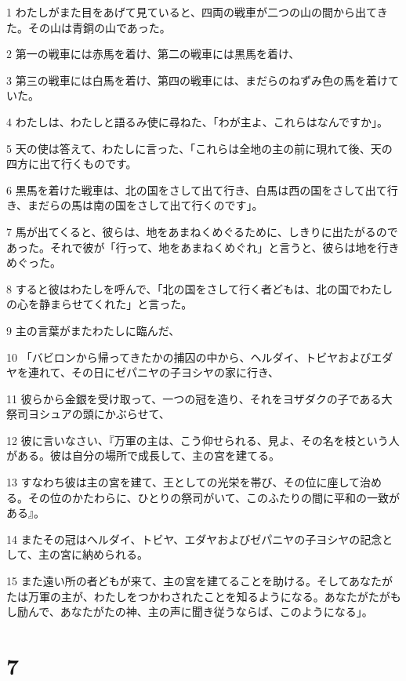 \par 1 わたしがまた目をあげて見ていると、四両の戦車が二つの山の間から出てきた。その山は青銅の山であった。
\par 2 第一の戦車には赤馬を着け、第二の戦車には黒馬を着け、
\par 3 第三の戦車には白馬を着け、第四の戦車には、まだらのねずみ色の馬を着けていた。
\par 4 わたしは、わたしと語るみ使に尋ねた、「わが主よ、これらはなんですか」。
\par 5 天の使は答えて、わたしに言った、「これらは全地の主の前に現れて後、天の四方に出て行くものです。
\par 6 黒馬を着けた戦車は、北の国をさして出て行き、白馬は西の国をさして出て行き、まだらの馬は南の国をさして出て行くのです」。
\par 7 馬が出てくると、彼らは、地をあまねくめぐるために、しきりに出たがるのであった。それで彼が「行って、地をあまねくめぐれ」と言うと、彼らは地を行きめぐった。
\par 8 すると彼はわたしを呼んで、「北の国をさして行く者どもは、北の国でわたしの心を静まらせてくれた」と言った。
\par 9 主の言葉がまたわたしに臨んだ、
\par 10 「バビロンから帰ってきたかの捕囚の中から、ヘルダイ、トビヤおよびエダヤを連れて、その日にゼパニヤの子ヨシヤの家に行き、
\par 11 彼らから金銀を受け取って、一つの冠を造り、それをヨザダクの子である大祭司ヨシュアの頭にかぶらせて、
\par 12 彼に言いなさい、『万軍の主は、こう仰せられる、見よ、その名を枝という人がある。彼は自分の場所で成長して、主の宮を建てる。
\par 13 すなわち彼は主の宮を建て、王としての光栄を帯び、その位に座して治める。その位のかたわらに、ひとりの祭司がいて、このふたりの間に平和の一致がある』。
\par 14 またその冠はヘルダイ、トビヤ、エダヤおよびゼパニヤの子ヨシヤの記念として、主の宮に納められる。
\par 15 また遠い所の者どもが来て、主の宮を建てることを助ける。そしてあなたがたは万軍の主が、わたしをつかわされたことを知るようになる。あなたがたがもし励んで、あなたがたの神、主の声に聞き従うならば、このようになる」。

\chapter{7}

